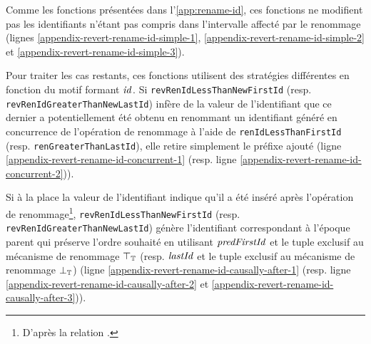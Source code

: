 Comme les fonctions présentées dans l'\autoref{app:rename-id}, ces fonctions ne modifient pas les identifiants n'étant pas compris dans l'intervalle affecté par le renommage (lignes \ref{appendix-revert-rename-id-simple-1}, \ref{appendix-revert-rename-id-simple-2} et \ref{appendix-revert-rename-id-simple-3}).

Pour traiter les cas restants, ces fonctions utilisent des stratégies différentes en fonction du motif formant $\mathit{id}$.
Si \texttt{revRenIdLessThanNewFirstId} (resp. \texttt{revRenIdGreaterThanNewLastId}) infère de la valeur de l'identifiant que ce dernier a potentiellement été obtenu en renommant un identifiant généré en concurrence de l'opération de renommage à l'aide de \texttt{renIdLessThanFirstId} (resp. \texttt{renGreaterThanLastId}), elle retire simplement le préfixe ajouté (ligne \ref{appendix-revert-rename-id-concurrent-1} (resp. ligne \ref{appendix-revert-rename-id-concurrent-2})).


Si à la place la valeur de l'identifiant indique qu'il a été inséré après l'opération de renommage\footnote{D'après la relation \hb.}, \texttt{revRenIdLessThanNewFirstId} (resp. \texttt{revRenIdGreaterThanNewLastId}) génère l'identifiant correspondant à l'époque parent qui préserve l'ordre souhaité en utilisant $\mathit{predFirstId}$ et le tuple exclusif au mécanisme de renommage $\top_\mathbb{T}$ (resp. $\mathit{lastId}$ et le tuple exclusif au mécanisme de renommage $\bot_\mathbb{T}$) (ligne \ref{appendix-revert-rename-id-causally-after-1} (resp. ligne \ref{appendix-revert-rename-id-causally-after-2} et \ref{appendix-revert-rename-id-causally-after-3})).

